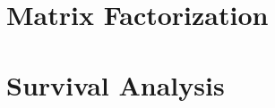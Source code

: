 \documentclass[letter]{article}
\begin{document}








\section{Matrix Factorization}









\section{Survival Analysis}








	
\end{document}
